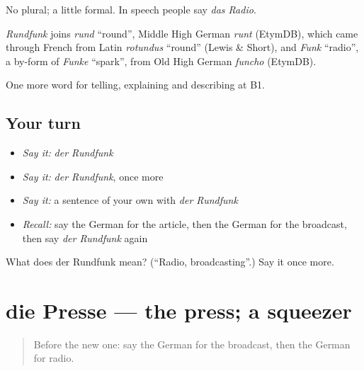 No plural; a little formal. In speech people say \emph{das Radio}.

\begin{cousinweb}
\emph{Rundfunk} joins \emph{rund} \textquotedblleft{}round\textquotedblright{}, Middle High German \emph{runt} (EtymDB), which came through French from Latin \emph{rotundus} \textquotedblleft{}round\textquotedblright{} (Lewis \& Short), and \emph{Funk} \textquotedblleft{}radio\textquotedblright{}, a by-form of \emph{Funke} \textquotedblleft{}spark\textquotedblright{}, from Old High German \emph{funcho} (EtymDB).
\end{cousinweb}

\begin{grammarlens}[title={What you've built}]
One more word for telling, explaining and describing at B1.
\end{grammarlens}

\subsection*{Your turn}
\begin{itemize}
\raggedright
  \item \emph{Say it:} \emph{der Rundfunk}
  \item \emph{Say it:} \emph{der Rundfunk}, once more
  \item \emph{Say it:} a sentence of your own with \emph{der Rundfunk}
  \item \emph{Recall:} say the German for the article, then the German for the broadcast, then say \emph{der Rundfunk} again
\end{itemize}

\begin{tcolorbox}[breakable,colback=teal!4,colframe=teal!35!black,title={Before you move on}]
What does der Rundfunk mean? (\textquotedblleft{}Radio, broadcasting\textquotedblright{}.) Say it once more.
\end{tcolorbox}
\section[die Presse]{die Presse — the press; a squeezer}

\label{lesson:GE-C272-presse}



\begin{quote}
Before the new one: say the German for the broadcast, then the German for radio.
\end{quote}

